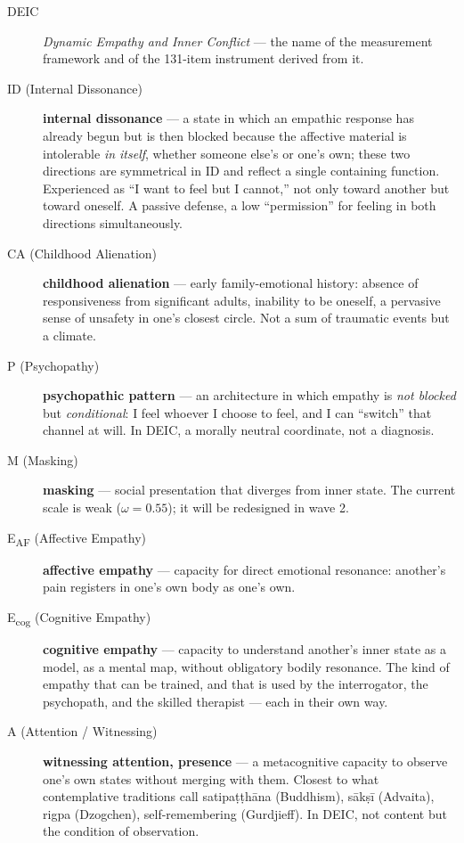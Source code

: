 \begin{description}
    \item[DEIC] \textit{Dynamic Empathy and Inner Conflict} --- the name of the measurement framework and of the 131-item instrument derived from it.
    \item[ID (Internal Dissonance)] \textbf{internal dissonance} --- a state in which an empathic response has already begun but is then blocked because the affective material is intolerable \emph{in itself}, whether someone else's or one's own; these two directions are symmetrical in ID and reflect a single containing function. Experienced as ``I want to feel but I cannot,'' not only toward another but toward oneself. A passive defense, a low ``permission'' for feeling in both directions simultaneously.
    \item[CA (Childhood Alienation)] \textbf{childhood alienation} --- early family-emotional history: absence of responsiveness from significant adults, inability to be oneself, a pervasive sense of unsafety in one's closest circle. Not a sum of traumatic events but a climate.
    \item[P (Psychopathy)] \textbf{psychopathic pattern} --- an architecture in which empathy is \emph{not blocked} but \emph{conditional}: I feel whoever I choose to feel, and I can ``switch'' that channel at will. In DEIC, a morally neutral coordinate, not a diagnosis.
    \item[M (Masking)] \textbf{masking} --- social presentation that diverges from inner state. The current scale is weak ($\omega = 0.55$); it will be redesigned in wave 2.
    \item[E\textsubscript{AF} (Affective Empathy)] \textbf{affective empathy} --- capacity for direct emotional resonance: another's pain registers in one's own body as one's own.
    \item[E\textsubscript{cog} (Cognitive Empathy)] \textbf{cognitive empathy} --- capacity to understand another's inner state as a model, as a mental map, without obligatory bodily resonance. The kind of empathy that can be trained, and that is used by the interrogator, the psychopath, and the skilled therapist --- each in their own way.
    \item[A (Attention / Witnessing)] \textbf{witnessing attention, presence} --- a metacognitive capacity to observe one's own states without merging with them. Closest to what contemplative traditions call satipa\d{t}\d{t}h\=ana (Buddhism), s\=ak\d{s}\=i (Advaita), rigpa (Dzogchen), self-remembering (Gurdjieff). In DEIC, not content but the condition of observation.
\end{description}

